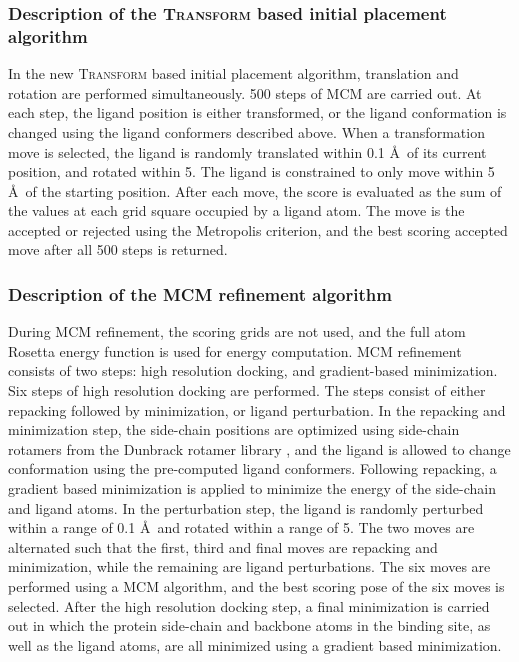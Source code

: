 \subsubsection{Description of the \textsc{Transform} based initial placement algorithm}

In the new \textsc{Transform} based initial placement algorithm, translation and rotation are performed simultaneously.
500 steps of \ac{MCM} are carried out.
At each step, the ligand position is either transformed, or the ligand conformation is changed using the ligand conformers described above.
When a transformation move is selected, the ligand is randomly translated within 0.1 \AA\ of its current position, and rotated within 5\textdegree.
The ligand is constrained to only move within 5 \AA\ of the starting position.
After each move, the score is evaluated as the sum of the values at each grid square occupied by a ligand atom.
The move is the accepted or rejected using the Metropolis criterion, and the best scoring accepted move after all 500 steps is returned.

\subsubsection{Description of the \acs{MCM} refinement algorithm}
During \ac{MCM} refinement, the scoring grids are not used, and the full atom Rosetta energy function is used for energy computation.
\ac{MCM} refinement consists of two steps: high resolution docking, and gradient-based minimization.
Six steps of high resolution docking are performed. The steps consist of either repacking followed by minimization, or ligand perturbation.
In the repacking and minimization step, the side-chain positions are optimized using side-chain rotamers from the Dunbrack rotamer library \citep{Shapovalov:2011bw}, and the ligand is allowed to change conformation using the pre-computed ligand conformers.
Following repacking, a gradient based minimization is applied to minimize the energy of the side-chain and ligand atoms.
In the perturbation step, the ligand is randomly perturbed within a range of 0.1 \AA\ and rotated within a range of 5\textdegree.
The two moves are alternated such that the first, third and final moves are repacking and minimization, while the remaining are ligand perturbations. The six moves are performed using a \ac{MCM} algorithm, and the best scoring pose of the six moves is selected.
After the high resolution docking step, a final minimization is carried out in which the protein side-chain and backbone atoms in the binding site, as well as the ligand atoms, are all minimized using a gradient based minimization.

